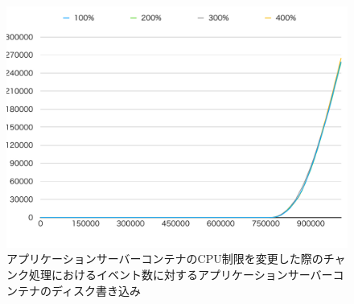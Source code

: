 \documentclass[../../../../../main]{subfiles}
\begin{document}
    \begin{figure}[H]
        \centering
        \includegraphics[width=12cm]{graph}
        \caption{アプリケーションサーバーコンテナのCPU制限を変更した際のチャンク処理におけるイベント数に対するアプリケーションサーバーコンテナのディスク書き込み}
        \label{fig:stream-change-app-cpu-limit-app-disk-in-app_1024-db_1_1024}
    \end{figure}
\end{document}
